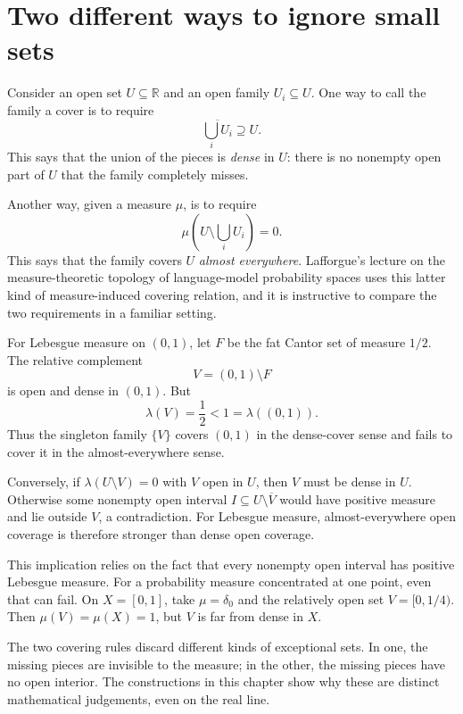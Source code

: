 \section{Two different ways to ignore small sets}

Consider an open set \(U\subseteq\mathbb R\) and an open family \(U_i\subseteq U\). One way to call the family a cover is to require
\[
 \overline{\bigcup_iU_i}\supseteq U.
\]
This says that the union of the pieces is \emph{dense} in \(U\): there is no nonempty open part of \(U\) that the family completely misses.

Another way, given a measure \(\mu\), is to require
\[
 \mu\left(U\setminus\bigcup_iU_i\right)=0.
\]
This says that the family covers \(U\) \emph{almost everywhere}. Lafforgue's lecture on the measure-theoretic topology of language-model probability spaces uses this latter kind of measure-induced covering relation, and it is instructive to compare the two requirements in a familiar setting.

For Lebesgue measure on \((0,1)\), let \(F\) be the fat Cantor set of measure \(1/2\). The relative complement
\[
 V=(0,1)\setminus F
\]
is open and dense in \((0,1)\). But
\[
 \lambda(V)=\frac12<1=\lambda((0,1)).
\]
Thus the singleton family \(\{V\}\) covers \((0,1)\) in the dense-cover sense and fails to cover it in the almost-everywhere sense.

Conversely, if \(\lambda(U\setminus V)=0\) with \(V\) open in \(U\), then \(V\) must be dense in \(U\). Otherwise some nonempty open interval \(I\subseteq U\setminus\overline V\) would have positive measure and lie outside \(V\), a contradiction. For Lebesgue measure, almost-everywhere open coverage is therefore stronger than dense open coverage.

This implication relies on the fact that every nonempty open interval has positive Lebesgue measure. For a probability measure concentrated at one point, even that can fail. On \(X=[0,1]\), take \(\mu=\delta_0\) and the relatively open set \(V=[0,1/4)\). Then \(\mu(V)=\mu(X)=1\), but \(V\) is far from dense in \(X\).

The two covering rules discard different kinds of exceptional sets. In one, the missing pieces are invisible to the measure; in the other, the missing pieces have no open interior. The constructions in this chapter show why these are distinct mathematical judgements, even on the real line.
